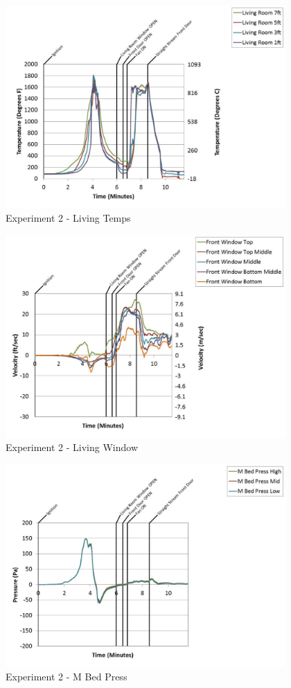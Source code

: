\documentclass{article}
\begin{document}
\begin{appendices}
	\clearpage

	\begin{figure}[h!]
		\centering
		\includegraphics[height=3.05in]{0_Images/Results_Charts/Exp_2_Charts/LivingTemps.pdf}
		\caption{Experiment 2 - Living Temps}
	\end{figure}
 

	\begin{figure}[h!]
		\centering
		\includegraphics[height=3.05in]{0_Images/Results_Charts/Exp_2_Charts/LivingWindow.pdf}
		\caption{Experiment 2 - Living Window}
	\end{figure}
 
	\clearpage

	\begin{figure}[h!]
		\centering
		\includegraphics[height=3.05in]{0_Images/Results_Charts/Exp_2_Charts/MBedPress.pdf}
		\caption{Experiment 2 - M Bed Press}
	\end{figure}
 


\end{appendices}
\end{document}
